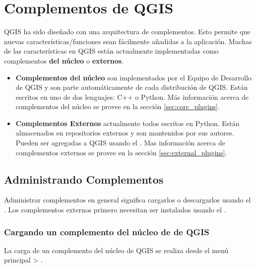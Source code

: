 
\section{Complementos de QGIS}\label{sec:plugins}


QGIS ha sido diseñado con una arquitectura de complementos.
Esto permite que nuevas características/funciones sean fácilmente añadidas a la aplicación.
Muchas de las características en QGIS están actualmente implementadas como complementos \textbf{del núcleo} o \textbf{externos}. 

\begin{itemize}
\item \textbf{Complementos del núcleo} son implementados por el Equipo de Desarrollo de QGIS y son parte automáticamente de cada distribución de QGIS.
Están escritos en uno de dos lenguajes: C++ o Python.
Más información acerca de complementos del núcleo se provee en la sección \ref{sec:core_plugins}.
\item \textbf{Complementos Externos} actualmente todos escritos en Python.
Están almacenados en repositorios externos y son mantenidos por sus autores.
Pueden ser agregadas a QGIS usando el .
Mas información acerca de complementos externos se provee en la sección \ref{sec:external_plugins}.
\end{itemize}

\subsection{Administrando Complementos}\label{sec:managing_plugins}

Administrar complementos en general significa cargarlos o descargarlos usando el .
Los complementos externos primero necesitan ser instalados usando el .

\subsubsection{Cargando un complemento del núcleo de de QGIS}\label{sec:load_core_plugin} 

La carga de un complemento del núcleo de QGIS se realiza desde el menú principal  > .

